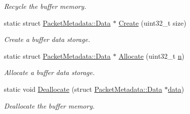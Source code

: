 \begin{DoxyCompactItemize}
\begin{DoxyCompactList}\small\item\em Recycle the buffer memory. \end{DoxyCompactList}\item 
static struct \hyperlink{structns3_1_1PacketMetadata_1_1Data}{Packet\+Metadata\+::\+Data} $\ast$ \hyperlink{classns3_1_1PacketMetadata_a94be0cf01bdfdf5dda7ae0afc475dc2a}{Create} (uint32\+\_\+t size)
\begin{DoxyCompactList}\small\item\em Create a buffer data storage. \end{DoxyCompactList}\item 
static struct \hyperlink{structns3_1_1PacketMetadata_1_1Data}{Packet\+Metadata\+::\+Data} $\ast$ \hyperlink{classns3_1_1PacketMetadata_a5cb8aff27ae7a4b60c0bc1a743e1cc8a}{Allocate} (uint32\+\_\+t \hyperlink{lte__link__budget__x2__handover__measures_8m_abdb05bc5a064cf642a06c83b3392f148}{n})
\begin{DoxyCompactList}\small\item\em Allocate a buffer data storage. \end{DoxyCompactList}\item 
static void \hyperlink{classns3_1_1PacketMetadata_a5284ea0e3b7e0e272ca521cb976431b7}{Deallocate} (struct \hyperlink{structns3_1_1PacketMetadata_1_1Data}{Packet\+Metadata\+::\+Data} $\ast$\hyperlink{topology-example-sim_8cc_a26c65296e316af77b787dc77469bb2a4}{data})
\begin{DoxyCompactList}\small\item\em Deallocate the buffer memory. \end{DoxyCompactList}\end{DoxyCompactItemize}
